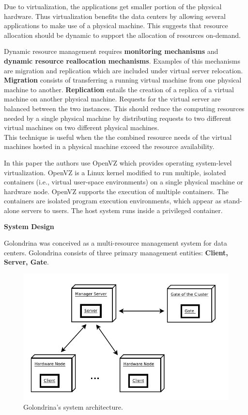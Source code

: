 \documentclass[conference]{IEEEtran}
\begin{document}
Due to virtualization, the applications get smaller portion of the physical hardware. Thus virtualization benefits the data centers by allowing several applications to make use of a physical machine. This suggests that resource allocation should be dynamic to
support the allocation of resources on-demand.


Dynamic resource management requires \textbf{monitoring mechanisms} and \textbf{dynamic resource reallocation mechanisms}. Examples of this mechanisms are migration and replication which are included under virtual server relocation. \textbf{Migration} consists of transferring a running virtual machine from one physical machine to another. \textbf{Replication} entails the creation of a replica of a virtual machine on another physical machine. Requests for the virtual server are balanced between the two instances. This should reduce the computing resources needed by a single physical machine by distributing requests to two different virtual machines on two different physical machines.\\
This technique is useful when the the combined resource needs of the virtual machines hosted in a physical machine exceed the resource availability.



In this paper the authors use OpenVZ which provides operating
system-level virtualization. OpenVZ is a Linux kernel modified to run multiple, isolated containers (i.e., virtual user-space environments) on a single physical  machine or hardware node. OpenVZ supports the execution of multiple containers. The containers are isolated program execution environments, which appear as stand-alone servers to users. The host system runs inside a privileged container.


\textbf{System Design} 


Golondrina was conceived as a multi-resource management system for data centers. Golondrina consists of three primary management entities: \textbf{Client, Server, Gate}.

\begin{figure}[h!]
  \centering
   \includegraphics[scale=0.50]{Golondrina.png}
  \caption{Golondrina's system architecture.}
\end{figure}
\end{document}
